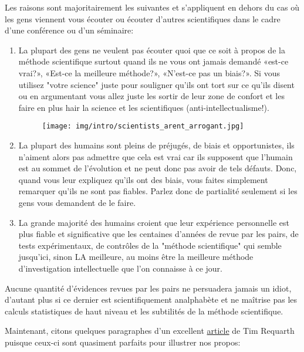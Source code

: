 	Les raisons sont majoritairement les suivantes et s'appliquent en dehors du cas où les gens viennent vous \'ecouter ou \'ecouter d'autres scientifiques dans le cadre d'une conf\'erence ou d'un s\'eminaire:
	\begin{enumerate}
		\item La plupart des gens ne veulent pas \'ecouter quoi que ce soit à propos de la m\'ethode scientifique surtout quand ils ne vous ont jamais demand\'e «est-ce vrai?», «Est-ce la meilleure m\'ethode?», «N'est-ce pas un biais?». Si vous utilisez "votre science" juste pour souligner qu'ils ont tort sur ce qu'ils disent ou en argumentant vous allez juste les sortir de leur zone de confort et les faire en plus hair la science et les scientifiques (anti-intellectualisme!).
		
		\begin{figure}[H]
			\centering
			\texttt{[image: img/intro/scientists\_arent\_arrogant.jpg]}	
		\end{figure}
		
		\item La plupart des humains sont pleins de pr\'ejug\'es, de biais et opportunistes, ils n'aiment alors pas admettre que cela est vrai car ils supposent que l'humain est au sommet de l'\'evolution et ne peut donc pas avoir de tels d\'efauts. Donc, quand vous leur expliquez qu'ils ont des biais, vous faites simplement remarquer qu'ils ne sont pas fiables. Parlez donc de partialit\'e seulement si les gens vous demandent de le faire.
		
		\item La grande majorit\'e des humains croient que leur exp\'erience personnelle est plus fiable et significative que les centaines d'ann\'ees de revue par les pairs, de tests exp\'erimentaux, de contrôles de la "m\'ethode scientifique" qui semble jusqu'ici, sinon LA meilleure, au moins être la meilleure m\'ethode d'investigation intellectuelle que l'on connaisse à ce jour.
	\end{enumerate}
	
	\begin{fquote}Aucune quantité d'évidences revues par les pairs ne persuadera jamais un idiot, d'autant plus si ce dernier est scientifiquement analphabète et ne maîtrise pas les calculs statistiques de haut niveau et les subtilités de la méthode scientifique.
 	\end{fquote}
	
	Maintenant, citons quelques paragraphes d'un excellent \href{http://www.slate.com/articles/health_and_science/science/2017/04/explaining_science_won_t_fix_information_illiteracy.html}{{\color{blue} article}} de Tim Requarth puisque ceux-ci sont quasiment parfaits pour illustrer nos propos:
	
